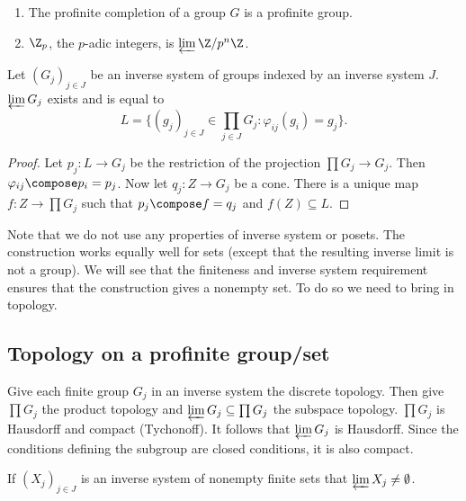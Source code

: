 \documentclass[a4paper]{article}
\begin{document}
\begin{eg}\leavevmode
  \begin{enumerate}
  \item The profinite completion of a group \(G\) is a profinite group.
  \item \(\Z_p\), the \(p\)-adic integers, is \(\varprojlim \Z/p^n\Z\).
  \end{enumerate}
\end{eg}

\begin{proposition}
  Let \((G_j)_{j \in J}\) be an inverse system of groups indexed by an inverse system \(J\). \(\varprojlim G_j\) exists and is equal to
  \[
    L = \{ (g_j)_{j \in J} \in \prod_{j \in J} G_j: \varphi_{ij} (g_i) = g_j \}.
  \]
\end{proposition}

\begin{proof}
  Let \(p_j: L \to G_j\) be the restriction of the projection \(\prod G_j \to G_j\). Then \(\varphi_{ij} \compose p_i = p_j\). Now let \(q_j: Z \to G_j\) be a cone. There is a unique map \(f: Z \to \prod G_j\) such that \(p_j \compose f = q_j\) and \(f(Z) \subseteq L\).
\end{proof}

Note that we do not use any properties of inverse system or posets. The construction works equally well for sets (except that the resulting inverse limit is not a group). We will see that the finiteness and inverse system requirement ensures that the construction gives a nonempty set. To do so we need to bring in topology.

\subsection{Topology on a profinite group/set}

Give each finite group \(G_j\) in an inverse system the discrete topology. Then give \(\prod G_j\) the product topology and \(\varprojlim G_j \subseteq \prod G_j\) the subspace topology. \(\prod G_j\) is Hausdorff and compact (Tychonoff). It follows that \(\varprojlim G_j\) is Hausdorff. Since the conditions defining the subgroup are closed conditions, it is also compact.

\begin{proposition}
  If \((X_j)_{j \in J}\) is an inverse system of nonempty finite sets that \(\varprojlim X_j \ne \emptyset\).
\end{proposition}
\end{document}
